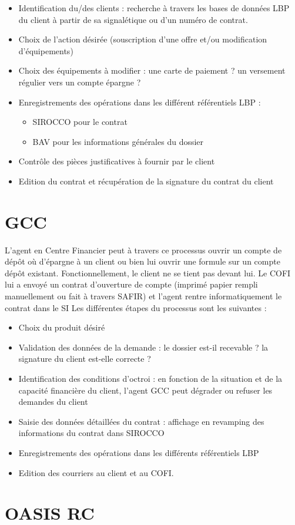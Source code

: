 \begin{itemize}
\item Identification du/des clients : recherche à travers les bases de données LBP du client à partir de sa signalétique ou d’un numéro de contrat.
\item Choix de l’action désirée (souscription d’une offre et/ou modification d’équipements)
\item Choix des équipements à modifier : une carte de paiement ? un versement régulier vers un compte épargne ?
\item Enregistrements des opérations dans les différent référentiels LBP :\begin{itemize}
												   \item SIROCCO pour le contrat
												   \item BAV pour les informations générales du dossier
												   \end{itemize}
\item Contrôle des pièces justificatives à fournir par le client
\item Edition du contrat et récupération de la signature du contrat du client
\end{itemize}


\section{GCC}

L’agent en Centre Financier peut à travers ce processus ouvrir un compte de dépôt où d'épargne à un client ou bien  lui ouvrir une formule sur un compte dépôt existant. 
Fonctionnellement, le client ne se tient pas devant lui. Le COFI lui a envoyé un contrat d’ouverture de compte (imprimé papier rempli manuellement ou fait à travers SAFIR) et l’agent rentre informatiquement le contrat dans le SI
Les différentes étapes du processus sont les suivantes :



\begin{itemize}
\item Choix du produit désiré
\item Validation des données de la demande : le dossier est-il recevable ? la signature du client est-elle correcte ?
\item Identification des conditions d’octroi : en fonction de la situation et de la capacité financière du client, l’agent GCC peut dégrader ou refuser les demandes du client
\item Saisie des données détaillées du contrat : affichage en revamping des informations du contrat dans SIROCCO
\item Enregistrements des opérations dans les différents référentiels LBP 
\item Edition des courriers au client et au COFI.
\end{itemize}

\section{OASIS RC}



















